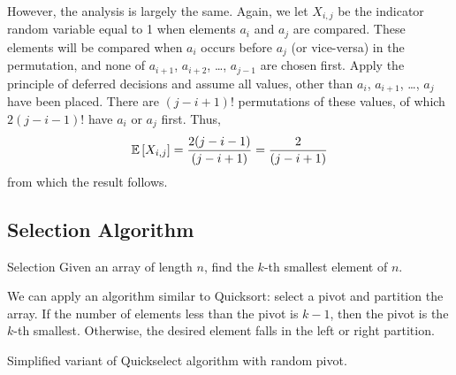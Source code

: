 However, the analysis is largely the same. Again, we let $X_{i,j}$ be the
indicator random variable equal to 1 when elements $a_i$ and $a_j$ are compared.
These elements will be compared when $a_i$ occurs before $a_j$ (or vice-versa)
in the permutation, and none of $a_{i+1}$, $a_{i+2}$, \dots, $a_{j - 1}$ are
chosen first. Apply the principle of deferred decisions and assume all values,
other than $a_i$, $a_{i+1}$, \dots, $a_j$ have been placed. There are $(j - i +
1)!$ permutations of these values, of which $2(j - i - 1)!$ have $a_i$ or $a_j$
first. Thus,
\[\operatorname{\mathbb{E}}\left[X_{i,j}\right] = \frac{2(j - i - 1)}{(j - i + 1)} = \frac{2}{(j - i + 1)}\]
from which the result follows.

\subsection{Selection Algorithm}
\begin{problem}{Selection}{}
    Given an array of length $n$, find the $k$-th smallest element of $n$.
\end{problem}
We can apply an algorithm similar to Quicksort: select a pivot and partition the
array. If the number of elements less than the pivot is $k - 1$, then the pivot
is the $k$-th smallest. Otherwise, the desired element falls in the left or
right partition. 

\begin{algorithm}[H]
    \caption{Simplified variant of Quickselect algorithm with random pivot.}
    \label{alg:randquickselect}
\end{algorithm}

